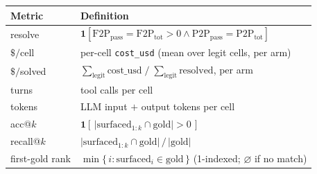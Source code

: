 \begin{tabular}{ll}
\toprule
Metric                   & Definition                                                                                  \\
\midrule
resolve                  & $\mathbf{1}[\text{F2P}_{\text{pass}}{=}\text{F2P}_{\text{tot}}{>}0 \land \text{P2P}_{\text{pass}}{=}\text{P2P}_{\text{tot}}]$ \\
$\$/$cell                & per-cell \texttt{cost\_usd} (mean over legit cells, per arm)                                \\
$\$/$solved              & $\sum_{\text{legit}} \text{cost\_usd} \;\big/\; \sum_{\text{legit}} \text{resolved}$, per arm \\
turns                    & tool calls per cell                                                                         \\
tokens                   & LLM input $+$ output tokens per cell                                                        \\
acc@$k$                  & $\mathbf{1}[\,|\text{surfaced}_{1{:}k} \cap \text{gold}| > 0\,]$                             \\
recall@$k$               & $|\text{surfaced}_{1{:}k} \cap \text{gold}| \,/\, |\text{gold}|$                             \\
first-gold rank          & $\min\{\,i : \text{surfaced}_i \in \text{gold}\,\}$ (1-indexed; $\varnothing$ if no match)   \\
\bottomrule
\end{tabular}

